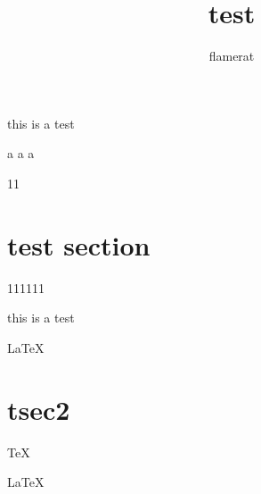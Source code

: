 \documentclass{article}
\author{flamerat}
\title{test}
\begin{document}
 \maketitle
 
 this is a test
 
 a \qquad a \qquad a
 
 11  
 
 \section{test section}
 
  111111
  
  this is a test
  
  \LaTeX
  
 \section{tsec2}
  
  \TeX
  
  \Large \LaTeX
\end{document}
